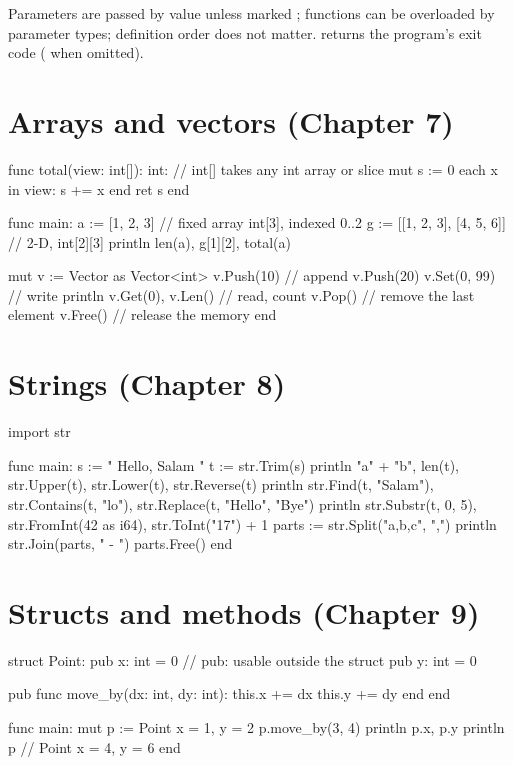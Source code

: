 \noindent Parameters are passed by value unless marked \code{\&:}; functions can
be overloaded by parameter types; definition order does not matter.
 returns the program's exit code ( when omitted).

\section*{Arrays and vectors (Chapter 7)}

\begin{salamen}
func total(view: int[]): int:        // int[] takes any int array or slice
    mut s := 0
    each x in view: s += x end
    ret s
end

func main:
    a := [1, 2, 3]                   // fixed array int[3], indexed 0..2
    g := [[1, 2, 3], [4, 5, 6]]      // 2-D, int[2][3]
    println len(a), g[1][2], total(a)

    mut v := Vector {} as Vector<int>
    v.Push(10)                       // append
    v.Push(20)
    v.Set(0, 99)                     // write
    println v.Get(0), v.Len()        // read, count
    v.Pop()                          // remove the last element
    v.Free()                         // release the memory
end
\end{salamen}

\section*{Strings (Chapter 8)}

\begin{salamen}
import str

func main:
    s := " Hello, Salam "
    t := str.Trim(s)
    println "a" + "b", len(t), str.Upper(t), str.Lower(t), str.Reverse(t)
    println str.Find(t, "Salam"), str.Contains(t, "lo"), str.Replace(t, "Hello", "Bye")
    println str.Substr(t, 0, 5), str.FromInt(42 as i64), str.ToInt("17") + 1
    parts := str.Split("a,b,c", ",")
    println str.Join(parts, " - ")
    parts.Free()
end
\end{salamen}

\section*{Structs and methods (Chapter 9)}

\begin{salamen}
struct Point:
    pub x: int = 0                   // pub: usable outside the struct
    pub y: int = 0

    pub func move_by(dx: int, dy: int):
        this.x += dx
        this.y += dy
    end
end

func main:
    mut p := Point { x = 1, y = 2 }
    p.move_by(3, 4)
    println p.x, p.y
    println p                        // Point {x = 4, y = 6}
end
\end{salamen}

